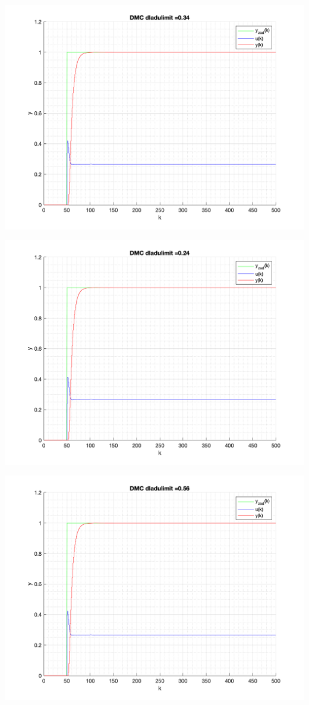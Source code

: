 \documentclass[a4paper, 11pt]{article}
\begin{document}
\begin{enumerate}
 \includegraphics[width=\linewidth]{./ModelsP6_dulimit/P4_DMC_dulimit_0_34_png.png} 
 
 \includegraphics[width=\linewidth]{./ModelsP6_dulimit/P4_DMC_dulimit_0_24_png.png} 
 
 \includegraphics[width=\linewidth]{./ModelsP6_dulimit/P4_DMC_dulimit_0_56_png.png} 
 

\end{enumerate}
\end{document}
